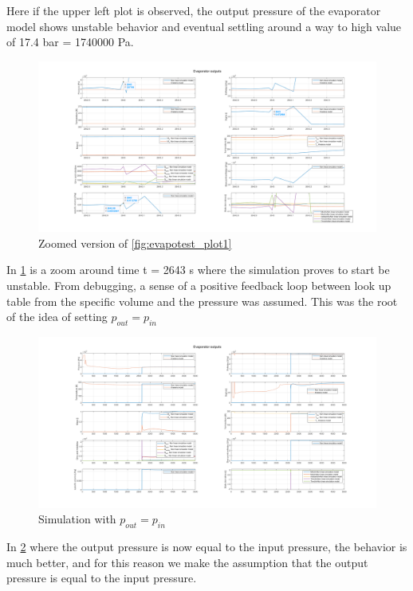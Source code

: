 Here if the upper left plot is observed, the output pressure of the evaporator model shows unstable behavior and eventual settling around a way to high value of 17.4 bar = 1740000 Pa.

\begin{figure}[h]
	\centering
	\includegraphics[width=2.1\textwidth]{Tests/Evapo_test1/plot_unstable_zoomed.png}
	\caption{Zoomed version of \cref{fig:evapotest_plot1}}
	\label{fig:evapotest_plot2}
\end{figure}
In \cref{fig:evapotest_plot2} is a zoom around time t = 2643 s where the simulation proves to start be unstable. From debugging, a sense of a positive feedback loop between look up table from the specific volume and the pressure was assumed. This was the root of the idea of setting $ p_{out} = p_{in} $

\begin{figure}[h]
	\centering
	\includegraphics[width=2.1\textwidth]{Tests/Evapo_test1/plot_stable.png}
	\caption{Simulation with $ p_{out} = p_{in} $}
	\label{fig:evapotest_plot3}
\end{figure}

In \cref{fig:evapotest_plot3} where the output pressure is now equal to the input pressure, the behavior is much better, and for this reason we make the assumption that the output pressure is equal to the input pressure.

